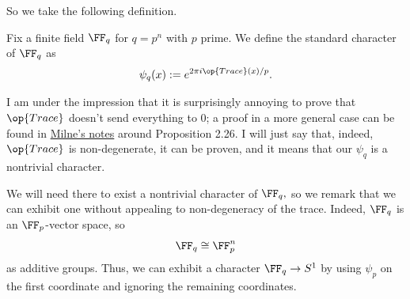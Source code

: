 So we take the following definition.
\begin{definition}
    Fix a finite field $\FF_q$ for $q=p^n$ with $p$ prime. We define the standard character of $\FF_q$ as
    \[\psi_q(x):=e^{2\pi i\op{Trace}(x)/p}.\]
\end{definition}
I am under the impression that it is surprisingly annoying to prove that $\op{Trace}$ doesn't send everything to $0$; a proof in a more general case can be found in \href{https://web.archive.org/web/20210128000435/https://www.jmilne.org/math/CourseNotes/ANT.pdf}{Milne's notes} around Proposition 2.26. I will just say that, indeed, $\op{Trace}$ is non-degenerate, it can be proven, and it means that our $\psi_q$ is a nontrivial character.

We will need there to exist a nontrivial character of $\FF_q,$ so we remark that we can exhibit one without appealing to non-degeneracy of the trace. Indeed, $\FF_q$ is an $\FF_p$-vector space, so
\[\FF_q\cong\FF_p^n\]
as additive groups. Thus, we can exhibit a character $\FF_q\to S^1$ by using $\psi_p$ on the first coordinate and ignoring the remaining coordinates.

